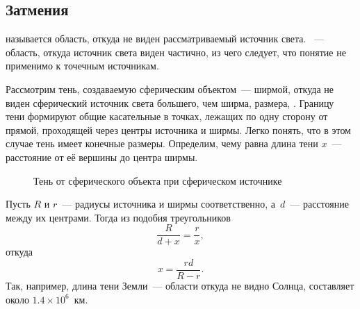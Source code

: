 \subsection{Затмения}
 называется область, откуда не виден рассматриваемый источник света. ~--- область, откуда источник света виден частично, из чего следует, что понятие  не применимо к точечным источникам.

Рассмотрим тень, создаваемую сферическим объектом~--- ширмой, откуда не виден сферический источник света большего, чем ширма, размера, . Границу тени формируют общие касательные в точках, лежащих по одну сторону от прямой, проходящей через центры источника и ширмы. Легко понять, что в этом случае тень имеет конечные размеры. Определим, чему равна длина тени $x$~--- расстояние от её вершины до центра ширмы.

\begin{figure}[h!]
    \centering
    \caption{Тень от сферического объекта при сферическом источнике}
    \label{pic:shadow-length}
\end{figure}

Пусть $R$ и $r$~--- радиусы источника и ширмы соответственно, а~$d$~--- расстояние между их центрами. Тогда из подобия треугольников
\begin{equation*}
    \frac{R}{d + x} = \frac{r}{x},
\end{equation*}
откуда
\begin{equation}
    x = \frac{r d}{R - r}.
    \label{eq:eclipses-shadow-length}
\end{equation}
Так, например, длина тени Земли~--- области откуда не видно Солнца, составляет около $1.4 \times 10^{6}$~км.

